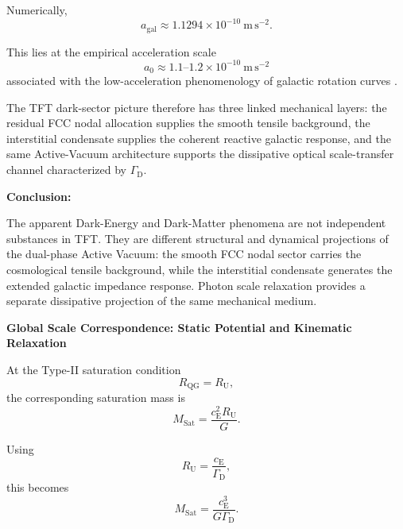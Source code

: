 Numerically,
\begin{equation}
    a_{\mathrm{gal}}
    \approx
    1.1294\times10^{-10}\ \mathrm{m\,s^{-2}}.
\end{equation}

This lies at the empirical acceleration scale
\begin{equation}
    a_0
    \approx
    1.1\text{--}1.2\times10^{-10}\ \mathrm{m\,s^{-2}}
\end{equation}
associated with the low-acceleration phenomenology of galactic rotation curves \cite{Milgrom_1983}.

The TFT dark-sector picture therefore has three linked mechanical layers: the residual FCC nodal allocation supplies the smooth tensile background, the interstitial condensate supplies the coherent reactive galactic response, and the same Active-Vacuum architecture supports the dissipative optical scale-transfer channel characterized by $\Gamma_{\mathrm D}$.

\vspace{0.5em}

\noindent\textbf{Conclusion:}

The apparent Dark-Energy and Dark-Matter phenomena are not independent substances in TFT. They are different structural and dynamical projections of the dual-phase Active Vacuum: the smooth FCC nodal sector carries the cosmological tensile background, while the interstitial condensate generates the extended galactic impedance response. Photon scale relaxation provides a separate dissipative projection of the same mechanical medium.


\vspace{0.5em}

\noindent\textbf{Global Scale Correspondence: Static Potential and Kinematic Relaxation}

At the Type-II saturation condition
\begin{equation}
    R_{\mathrm{QG}}
    =
    R_{\mathrm U},
\end{equation}
the corresponding saturation mass is
\begin{equation}
    M_{\mathrm{Sat}}
    =
    \frac{c_{\mathrm E}^2R_{\mathrm U}}{G}.
\end{equation}

Using
\begin{equation}
    R_{\mathrm U}
    =
    \frac{c_{\mathrm E}}{\Gamma_{\mathrm D}},
\end{equation}
this becomes
\begin{equation}
    M_{\mathrm{Sat}}
    =
    \frac{c_{\mathrm E}^3}
    {G\Gamma_{\mathrm D}}.
\end{equation}

